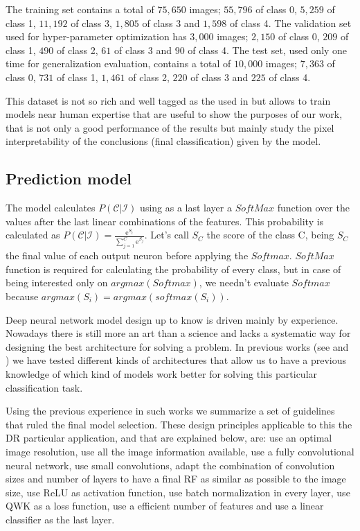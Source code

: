 \documentclass[preprint]{elsarticle}
\theoremstyle{definition} %
\theoremstyle{remark}
\newcommand{\me}{\mathrm{e}} %
\begin{document}
The training set contains a total of $75,650$ images; $55,796$ of class 0, $5,259$ of class 1, $11,192$ of class 3, $1,805$ of class 3 and $1,598$ of class 4. The validation set used for hyper-parameter optimization has $3,000$ images; $2,150$ of class 0, $209$ of class 1, $490$ of class 2, $61$ of class 3 and $90$ of class 4. The test set, used only one time for generalization evaluation, contains a total of $10,000$ images; $7,363$ of class 0, $731$ of class 1, $1,461$ of class 2, $220$ of class 3 and $225$ of class 4. 

This dataset is not so rich and well tagged as the used in \citep{doi:10.1001/jama.2016.17216} but allows to train models near human expertise that are useful to show the purposes of our work, that is not only a good performance of the results but mainly study the pixel interpretability of the conclusions (final classification) given by the model.

\subsection{Prediction model}

The model calculates $P(\mathcal{C} | \mathcal{I})$ using as a last layer a $SoftMax$ function over the values after the last linear combinations of the features. This probability is calculated as $P(\mathcal{C} | \mathcal{I}) = \frac{\me^{S_{i}}}{\sum_{j=1}^{C} \me^{S_{j}}}$. Let's call $S_{C}$ the score of the class C, being $S_C$ the final value of each output neuron before applying the $Softmax$. $SoftMax$ function is required for calculating the probability of every class, but in case of being interested only on $argmax(Softmax)$, we needn't evaluate $Softmax$ because $argmax(S_i) = argmax(softmax(S_i))$.

Deep neural network model design up to know is driven mainly by experience. Nowadays there is still more an art than a science and lacks a systematic way for designing the best architecture for solving a problem. In previous works (see \cite{jdelatorre-2016} and \cite{jdelatorre-2017}) we have tested different kinds of architectures that allow us to have a previous knowledge of which kind of models work better for solving this particular classification task.

Using the previous experience in such works we summarize a set of guidelines that ruled the final model selection. These design principles applicable to this the DR particular application, and that are explained below, are: use an optimal image resolution, use all the image information available, use a fully convolutional neural network, use small convolutions, adapt the combination of convolution sizes and number of layers to have a final RF as similar as possible to the image size, use ReLU as activation function, use batch normalization in every layer, use QWK as a loss function, use a efficient number of features and use a linear classifier as the last layer.
\end{document}
